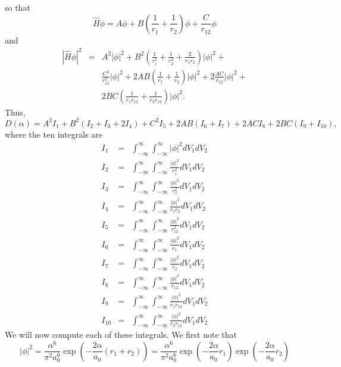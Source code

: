 \documentclass{article}
\numberwithin{equation}{section}
\begin{document}
so that
\begin{equation}\label{s5e61}
\hat{H}\phi = A\phi + B\left(\frac{1}{r_1} + \frac{1}{r_2}\right)\phi +
\frac{C}{r_{12}}\phi
\end{equation}
and
\begin{eqnarray*}
|\hat{H}\phi|^2 &=& A^2|\phi|^2 + B^2\left(\frac{1}{r_1^2} + 
  \frac{1}{r_2^2} + \frac{2}{r_1r_2}\right)|\phi|^2 + \\
  & & \frac{C^2}{r_{12}^2}|\phi|^2 + 2AB\left(\frac{1}{r_1}+\frac{1}{r_2}
  \right)|\phi|^2 + 2\frac{AC}{r_{12}}|\phi|^2 + \\
  & & 2BC\left(\frac{1}{r_1r_{12}} + \frac{1}{r_2r_{12}}\right)|\phi|^2.
\end{eqnarray*}
Thus,
\begin{equation}\label{s5e62}
D(\alpha) = A^2I_1 + B^2(I_2 + I_3 + 2I_4) + C^2I_5 + 2AB(I_6 + I_7) 
    + 2ACI_8 + 2BC(I_9 + I_{10}),
\end{equation}
where the ten integrals are
\begin{eqnarray}
I_1 &=& \int_{-\infty}^\infty\int_{-\infty}^\infty |\phi|^2 dV_1 dV_2 
        \label{s5e63} \\
I_2 &=& \int_{-\infty}^\infty\int_{-\infty}^\infty\frac{|\phi|^2}{r_1^2}
        dV_1dV_2\label{s5e64}\\
I_3 &=& \int_{-\infty}^\infty\int_{-\infty}^\infty\frac{|\phi|^2}{r_2^2}
        dV_1dV_2\label{s5e65}\\
I_4 &=& \int_{-\infty}^\infty\int_{-\infty}^\infty\frac{|\phi|^2}{r_1r_2}
        dV_1dV_2\label{s5e66}\\
I_5 &=& \int_{-\infty}^\infty\int_{-\infty}^\infty\frac{|\phi|^2}{r_{12}^2}
        dV_1dV_2\label{s5e67}\\
I_6 &=& \int_{-\infty}^\infty\int_{-\infty}^\infty\frac{|\phi|^2}{r_1}
        dV_1dV_2\label{s5e68}\\
I_7 &=& \int_{-\infty}^\infty\int_{-\infty}^\infty\frac{|\phi|^2}{r_2}
        dV_1dV_2\label{s5e69}\\
I_8 &=& \int_{-\infty}^\infty\int_{-\infty}^\infty\frac{|\phi|^2}{r_{12}}
        dV_1dV_2\label{s5e70}\\
I_9 &=& \int_{-\infty}^\infty\int_{-\infty}^\infty\frac{|\phi|^2}
        {r_1r_{12}}dV_1dV_2 \label{s5e71}\\
I_{10} &=& \int_{-\infty}^\infty\int_{-\infty}^\infty\frac{|\phi|^2}
        {r_2r_{12}}dV_1dV_2 \label{s5e72}
\end{eqnarray}
We will now compute each of these integrals. We first note that
\[
|\phi|^2 = 
\frac{\alpha^6}{\pi^2 a_0^6}\exp\left(-\frac{2\alpha}{a_0}(r_1+r_2)\right)
= \frac{\alpha^6}{\pi^2 a_0^6}\exp\left(-\frac{2\alpha}{a_0}r_1\right)
\exp\left(-\frac{2\alpha}{a_0}r_2\right)  
\]
\end{document}
